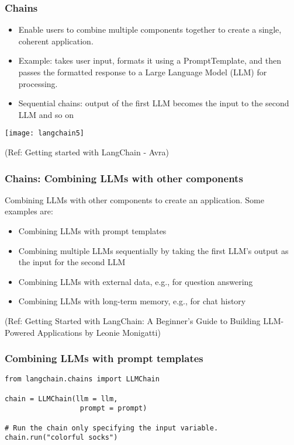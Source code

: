 \begin{frame}\frametitle{Chains}

\begin{itemize}
\item Enable users to combine multiple components together to create a single, coherent application.
\item Example: takes user input, formats it using a PromptTemplate, and then passes the formatted response to a Large Language Model (LLM) for processing.
\item Sequential chains: output of the first LLM becomes the input to the second LLM and so on
\end{itemize}

\begin{center}
\texttt{[image: langchain5]}
\end{center}	  


{\tiny (Ref: Getting started with LangChain - Avra)}
\end{frame}

\begin{frame}[fragile]\frametitle{Chains: Combining LLMs with other components}

Combining LLMs with other components to create an application. Some examples are:


\begin{itemize}
\item Combining LLMs with prompt templates 
\item Combining multiple LLMs sequentially by taking the first LLM’s output as the input for the second LLM 
\item Combining LLMs with external data, e.g., for question answering 
\item Combining LLMs with long-term memory, e.g., for chat history
\end{itemize}

{\tiny (Ref: Getting Started with LangChain: A Beginner’s Guide to Building LLM-Powered Applications by Leonie Monigatti)}

\end{frame}

\begin{frame}[fragile]\frametitle{Combining LLMs with prompt templates}



\begin{lstlisting}
from langchain.chains import LLMChain

chain = LLMChain(llm = llm, 
                  prompt = prompt)

# Run the chain only specifying the input variable.
chain.run("colorful socks")
\end{lstlisting}


\end{frame}

